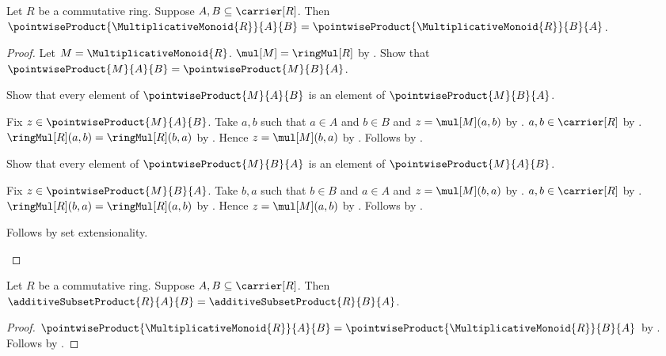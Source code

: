 \begin{theorem}\label{commutative_ring_pointwise_product_commutative}
    Let $R$ be a commutative ring.
    Suppose $A,B\subseteq\carrier[R]$.
    Then $\pointwiseProduct{\MultiplicativeMonoid{R}}{A}{B}
        =\pointwiseProduct{\MultiplicativeMonoid{R}}{B}{A}$.
\end{theorem}
\begin{proof}
    Let $M=\MultiplicativeMonoid{R}$.
    $\mul[M]=\ringMul[R]$ by .
    Show that $\pointwiseProduct{M}{A}{B}
        =\pointwiseProduct{M}{B}{A}$.
    \begin{subproof}
        Show that every element of $\pointwiseProduct{M}{A}{B}$ is an
            element of $\pointwiseProduct{M}{B}{A}$.
        \begin{subproof}
            Fix $z\in\pointwiseProduct{M}{A}{B}$.
            Take $a,b$ such that $a\in A$ and $b\in B$ and
                $z=\mul[M](a,b)$ by .
            $a,b\in\carrier[R]$ by .
            $\ringMul[R](a,b)=\ringMul[R](b,a)$ by
                .
            Hence $z=\mul[M](b,a)$ by \auto.
            Follows by .
        \end{subproof}
        Show that every element of $\pointwiseProduct{M}{B}{A}$ is an
            element of $\pointwiseProduct{M}{A}{B}$.
        \begin{subproof}
            Fix $z\in\pointwiseProduct{M}{B}{A}$.
            Take $b,a$ such that $b\in B$ and $a\in A$ and
                $z=\mul[M](b,a)$ by .
            $a,b\in\carrier[R]$ by .
            $\ringMul[R](b,a)=\ringMul[R](a,b)$ by
                .
            Hence $z=\mul[M](a,b)$ by \auto.
            Follows by .
        \end{subproof}
        Follows by set extensionality.
    \end{subproof}
\end{proof}

\begin{theorem}\label{additive_subset_product_commutative}
    Let $R$ be a commutative ring.
    Suppose $A,B\subseteq\carrier[R]$.
    Then $\additiveSubsetProduct{R}{A}{B}
        =\additiveSubsetProduct{R}{B}{A}$.
\end{theorem}
\begin{proof}
    $\pointwiseProduct{\MultiplicativeMonoid{R}}{A}{B}
        =\pointwiseProduct{\MultiplicativeMonoid{R}}{B}{A}$ by
        .
    Follows by .
\end{proof}

